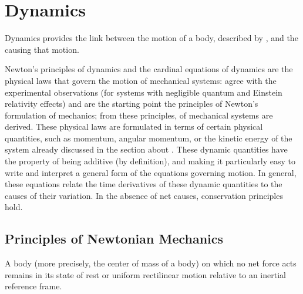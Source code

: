\documentclass[letterpaper,10pt,english]{jupyterBook}
\begin{document}
\chapter{Dynamics}
\label{\detokenize{ch/dynamics:dynamics}}\label{\detokenize{ch/dynamics:classical-mechanics-dynamics}}\label{\detokenize{ch/dynamics::doc}}
\sphinxAtStartPar
Dynamics provides the link between the motion of a body, described by {\hyperref[\detokenize{ch/kinematics:classical-mechanics-kinematics}]{}}, and the  causing that motion.

\sphinxAtStartPar
Newton’s principles of dynamics and the cardinal equations of dynamics are the physical laws that govern the motion of mechanical systems: {\hyperref[\detokenize{ch/dynamics-principles:classical-mechanics-dynamics-principles}]{}} agree with the experimental observations (for systems with negligible quantum and Einstein relativity effects) and are the starting point \sphinxhyphen{} the principles \sphinxhyphen{} of Newton’s formulation of mechanics; from these principles, {\hyperref[\detokenize{ch/dynamics-eom:classical-mechanics-dynamics-eom}]{}} of mechanical systems are derived.
These physical laws are formulated in terms of certain physical quantities, such as momentum, angular momentum, or the kinetic energy of the system \sphinxhyphen{} already discussed in the section about {\hyperref[\detokenize{ch/inertia:classical-mechanics-inertia}]{}}. These dynamic quantities have the property of being additive (by definition), and making it particularly easy to write and interpret a general form of the equations governing motion. In general, these equations relate the time derivatives of these dynamic quantities to the causes of their variation. In the absence of net causes, conservation principles hold.



\sphinxstepscope


\section{Principles of Newtonian Mechanics}
\label{\detokenize{ch/dynamics-principles:principles-of-newtonian-mechanics}}\label{\detokenize{ch/dynamics-principles:classical-mechanics-dynamics-principles}}\label{\detokenize{ch/dynamics-principles::doc}}
\sphinxAtStartPar
{} A body (more precisely, the center of mass of a body) on which no net force acts remains in its state of rest or uniform rectilinear motion relative to an inertial reference frame.
\end{document}
